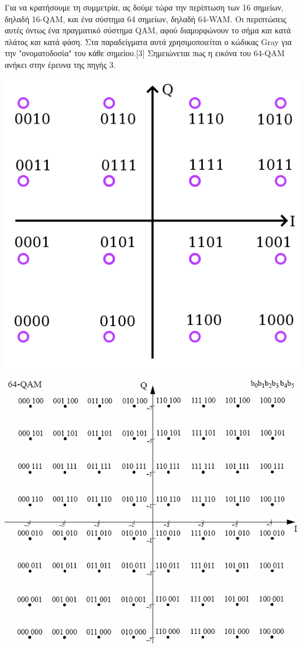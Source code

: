 \documentclass{article}
\begin{document}
Για να κρατήσουμε τη συμμετρία, ας δούμε τώρα την περίπτωση των 16 σημείων, δηλαδή 16-QAM, και ένα σύστημα 64 σημείων, δηλαδή 64-WAM. Οι περιπτώσεις αυτές όντως ένα πραγματικό σύστημα QAM, αφού διαμορφώνουν το σήμα \emph{και} κατά πλάτος \emph{και} κατά φάση. Στα παραδείγματα αυτά χρησιμοποιείται ο κώδικας Gray για την "ονοματοδοσία" του κάθε σημείου.[3] Σημειώνεται πως η εικόνα του 64-QAM ανήκει στην έρευνα της πηγής 3.
\begin{center}
    \includegraphics[scale=0.5]{diktya_pic5.png}\\
    \includegraphics[scale=0.4]{64-QAM-Signal-Constellation-with-Gray-Coding.png}
\end{center}
\end{document}
